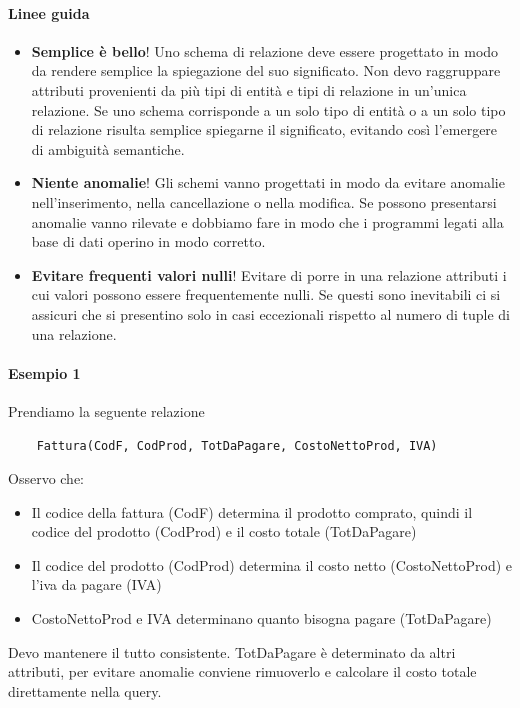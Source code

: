 \paragraph{Linee guida}
\begin{itemize}
	\item \textbf{Semplice è bello}! Uno schema di relazione deve essere progettato in modo da rendere semplice la spiegazione del suo significato. Non devo raggruppare attributi provenienti da più tipi di entità e tipi di relazione in un'unica relazione. Se uno schema corrisponde a un solo tipo di entità o a un solo tipo di relazione risulta semplice spiegarne il significato, evitando così l'emergere di ambiguità semantiche.
	\item \textbf{Niente anomalie}! Gli schemi vanno progettati in modo da evitare anomalie nell'inserimento, nella cancellazione o nella modifica. Se possono presentarsi anomalie vanno rilevate e dobbiamo fare in modo che i programmi legati alla base di dati operino in modo corretto.
	\item \textbf{Evitare frequenti valori nulli}! Evitare di porre in una relazione attributi i cui valori possono essere frequentemente nulli. Se questi sono inevitabili ci si assicuri che si presentino solo in casi eccezionali rispetto al numero di tuple di una relazione. 
\end{itemize}
\paragraph{Esempio 1} Prendiamo la seguente relazione
\begin{verbatim}
	Fattura(CodF, CodProd, TotDaPagare, CostoNettoProd, IVA)
\end{verbatim}
Osservo che:
\begin{itemize}
	\item Il codice della fattura (CodF) determina il prodotto comprato, quindi il codice del prodotto (CodProd) e il costo totale (TotDaPagare)
	\item Il codice del prodotto (CodProd) determina il costo netto (CostoNettoProd) e l'iva da pagare (IVA)
	\item CostoNettoProd e IVA determinano quanto bisogna pagare (TotDaPagare)
\end{itemize}
Devo mantenere il tutto consistente. TotDaPagare è determinato da altri attributi, per evitare anomalie conviene rimuoverlo e calcolare il costo totale direttamente nella query.
